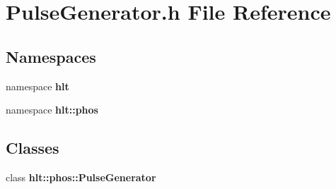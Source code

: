 \section{Pulse\-Generator.h File Reference}
\label{PulseGenerator_8h}
\subsection*{Namespaces}
\begin{CompactItemize}
\item 
namespace {\bf hlt}
\item 
namespace {\bf hlt::phos}
\end{CompactItemize}
\subsection*{Classes}
\begin{CompactItemize}
\item 
class {\bf hlt::phos::Pulse\-Generator}
\end{CompactItemize}
